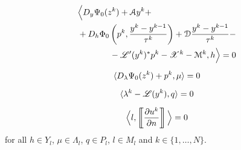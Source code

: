 \documentclass[8pt]{beamer}
\numberwithin{equation}{section}
\theoremstyle{definition}
\DeclarePairedDelimiter{\dual}{\langle}{\rangle}
\newcommand{\dind}[2]{\frac{\partial #1}{\partial #2}}
\begin{document}
\begin{frame}
\begin{minipage}[c]{0.54\textwidth}
\begin{gather*}
\begin{multlined}
\Big\langle D_y\Psi_0(z^k)+\mathcal{A}y^k+\\
+D_h\Phi_0\left(p^k,\frac{y^k-y^{k-1}}{\tau^k}\right)+\mathcal{D}\frac{y^k-y^{k-1}}{\tau^k}-\\
-\mathscr{L}'(y^k)^*p^k-\mathscr{X}^k-\mathcal{M}^k,h\Big\rangle=0
\end{multlined} \\[0.5em]
\dual{D_\lambda\Psi_0(z^k)+p^k,\mu}=0 \\[0.5em]
\dual{\lambda^k-\mathscr{L}(y^k),q}=0 \\[0.5em]
\Big\langle l,\left[\!\!\left[\dind{u^k}{n}\right]\!\!\right]\Big\rangle=0
\end{gather*}
for all $h\in Y_l$, $\mu\in\Lambda_l$, $q\in P_l$, $l\in M_l$ and $k\in\{1,\dots,N\}$.
\end{minipage}
\end{frame}
\end{document}
